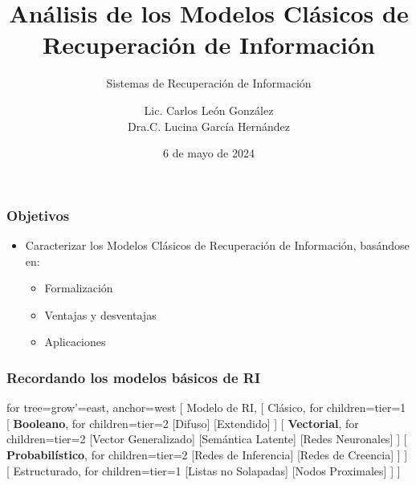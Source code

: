 \documentclass[
10pt, %
aspectratio=169, %
]{beamer}
\title[Short Title]{Análisis de los Modelos Clásicos de Recuperación de Información}
\subtitle{Sistemas de Recuperación de Información}
\author{Lic. Carlos León González \\ Dra.C. Lucina García Hernández}
\institute[UC]{Facultad de Matem\'atica y Computaci\'on \\ Universidad de La Habana \\ \smallskip }
\date{6 de mayo de  2024} %
\begin{document}
	
	
	
	\begin{frame}
		\titlepage
	\end{frame}
	
	\begin{frame}
		
		\frametitle{Objetivos}
		
		\begin{itemize}
			\item Caracterizar los Modelos Clásicos de Recuperación de Información, basándose en: \\[2.5mm]
			
			\begin{itemize}
				\item Formalización \\[2mm]
				\item Ventajas y desventajas \\[2mm]
				\item Aplicaciones
			\end{itemize}
			
		\end{itemize}
		
	\end{frame}
		
	\begin{frame}
		
		\frametitle{Recordando los modelos básicos de RI}
		
		\centering
		
		\begin{forest}
			for tree={grow'=east, anchor=west}
			[ Modelo de RI, 
			[
			Clásico, 
			for children={tier=1} 
			[
			\textbf{Booleano}, 
			for children={tier=2} 
			[Difuso]
			[Extendido]
			]
			[
			\textbf{Vectorial}, 
			for children={tier=2} 
			[Vector Generalizado]
			[Semántica Latente]
			[Redes Neuronales]
			]
			[
			\textbf{Probabilístico}, 
			for children={tier=2} 
			[Redes de Inferencia]
			[Redes de Creencia]
			]
			] 
			[
			Estructurado, 
			for children={tier=1}
			[Listas no Solapadas]
			[Nodos Proximales]
			]
			]
		\end{forest}
		
	\end{frame}
	
\end{document}
